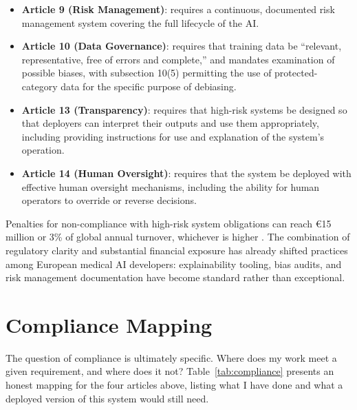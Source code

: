 \begin{itemize}
 \item \textbf{Article 9 (Risk Management)}: requires a continuous, documented risk management system covering the full lifecycle of the AI.
 \item \textbf{Article 10 (Data Governance)}: requires that training data be ``relevant, representative, free of errors and complete,'' and mandates examination of possible biases, with subsection 10(5) permitting the use of protected-category data for the specific purpose of debiasing.
 \item \textbf{Article 13 (Transparency)}: requires that high-risk systems be designed so that deployers can interpret their outputs and use them appropriately, including providing instructions for use and explanation of the system's operation.
 \item \textbf{Article 14 (Human Oversight)}: requires that the system be deployed with effective human oversight mechanisms, including the ability for human operators to override or reverse decisions.
\end{itemize}

Penalties for non-compliance with high-risk system obligations can reach €15 million or 3\% of global annual turnover, whichever is higher \citep{eu2024aiact}. The combination of regulatory clarity and substantial financial exposure has already shifted practices among European medical AI developers: explainability tooling, bias audits, and risk management documentation have become standard rather than exceptional.

\section{Compliance Mapping}

The question of compliance is ultimately specific. Where does my work meet a given requirement, and where does it not? Table~\ref{tab:compliance} presents an honest mapping for the four articles above, listing what I have done and what a deployed version of this system would still need.


